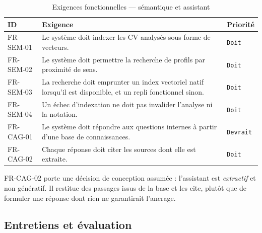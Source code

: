 \begin{table}[htbp]
  \centering
  \caption{Exigences fonctionnelles — sémantique et assistant}
  \label{tab:fr_semantic}
  \begin{tabularx}{\textwidth}{L{2.4cm} X L{1.9cm}}
    \toprule
    \textbf{ID} & \textbf{Exigence} & \textbf{Priorité} \\
    \midrule
    FR-SEM-01 & Le système doit indexer les CV analysés sous forme de vecteurs. & \texttt{Doit} \\
    FR-SEM-02 & Le système doit permettre la recherche de profils par proximité de sens. & \texttt{Doit} \\
    FR-SEM-03 & La recherche doit emprunter un index vectoriel natif lorsqu'il est disponible, et un repli fonctionnel sinon. & \texttt{Doit} \\
    FR-SEM-04 & Un échec d'indexation ne doit pas invalider l'analyse ni la notation. & \texttt{Doit} \\
    FR-CAG-01 & Le système doit répondre aux questions internes à partir d'une base de connaissances. & \texttt{Devrait} \\
    FR-CAG-02 & Chaque réponse doit citer les sources dont elle est extraite. & \texttt{Doit} \\
    \bottomrule
  \end{tabularx}
\end{table}

FR-CAG-02 porte une décision de conception assumée : l'assistant est
\emph{extractif} et non génératif. Il restitue des passages issus de la base et
les cite, plutôt que de formuler une réponse dont rien ne garantirait l'ancrage.

\subsection{Entretiens et évaluation}
\label{sec:fr_interviews}

